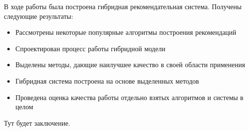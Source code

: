 \documentclass[a4paper,article,14pt]{extarticle}
\begin{document}
В ходе работы была построена гибридная рекомендательная система.
Получены следующие результаты:

\begin{itemize}
\item Рассмотрены некоторые популярные алгоритмы построения рекомендаций
\item Спроектирован процесс работы гибридной модели
\item Выделены методы, дающие наилучшее качество в своей области применения
\item Гибридная система построена на основе выделенных методов
\item Проведена оценка качества работы отдельно взятых алгоритмов и системы в целом
\end{itemize}

\pagebreak
{}
Тут будет заключение.

\pagebreak
\end{document}
